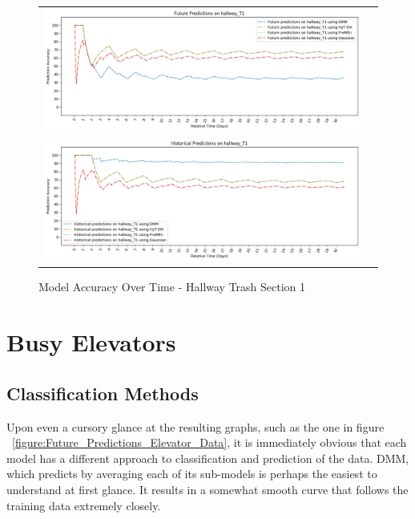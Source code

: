 \begin{center}
\begin{figure}[!Hp]
  \begin{tabular}{cc}
    {\includegraphics[width = 6in]{images/results/Future_Predictions_on_hallway_T1.png}} \\
    {\includegraphics[width = 6in]{images/results/Historical_Predictions_on_hallway_T1.png}} \\
  \end{tabular}
  \caption{Model Accuracy Over Time - Hallway Trash Section 1}
\end{figure}
\end{center}




\section{ Busy Elevators }

\subsection{ Classification Methods }

Upon even a cursory glance at the resulting graphs, such as the one in figure
~\ref{figure:Future_Predictions_Elevator_Data}, it is immediately
obvious that each model has a different approach to classification and
prediction of the data. DMM, which predicts by
averaging each of its sub-models is perhaps the easiest to understand at first
glance. It results in a somewhat smooth curve that follows the training data
extremely closely. \\

